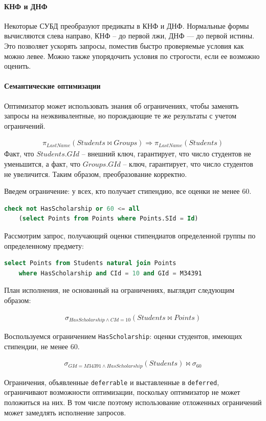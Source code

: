 \paragraph{КНФ и ДНФ}

Некоторые СУБД преобразуют предикаты в КНФ и ДНФ. Нормальные формы вычисляются слева направо, КНФ
-- до первой лжи, ДНФ --- до первой истины. Это позволяет ускорять запросы, поместив быстро
проверяемые условия как можно левее. Можно также упорядочить условия по строгости, если ее возможно
оценить.

\paragraph{Семантические оптимизации}

Оптимизатор может использовать знания об ограничениях, чтобы заменять запросы на неэквивалентные,
но порождающие те же результаты с учетом ограничений.

\begin{example}
	\enewline
	\begin{align}
		\pi_{LastName}(Students \bowtie Groups) \Rightarrow \pi_{LastName}(Students)
	\end{align}
	Факт, что $Students.GId$ -- внешний ключ, гарантирует, что число студентов не уменьшится, а
	факт, что $Groups.GId$ -- ключ, гарантирует, что число студентов не увеличится. Таким
	образом, преобразование корректно.
\end{example}

\begin{example}
	Введем ограничение: у всех, кто получает стипендию, все оценки не менее 60.

	\begin{lstlisting}[language=SQL]
    check not HasScholarship or 60 <= all
    (select Points from Points where Points.SId = Id)
    \end{lstlisting}

	Рассмотрим запрос, получающий оценки стипендиатов определенной группы по определенному предмету:

	\begin{lstlisting}[language=SQL]
    select Points from Students natural join Points
    where HasScholarship and CId = 10 and GId = M34391
    \end{lstlisting}

	План исполнения, не основанный на ограничениях, выглядит следующим образом:

	\begin{align}
		\sigma_{HasScholarship \wedge CId = 10}(Students \bowtie Points)
	\end{align}

	Воспользуемся ограничением \texttt{HasScholarship}: оценки студентов, имеющих стипендии, не менее
	60.

	\begin{align}
		\sigma_{GId = M34391 \wedge HasScholarship}(Students) \bowtie \sigma_{60 }
	\end{align}
\end{example}

\begin{remark}
	Ограничения, объявленные \texttt{deferrable} и выставленные в \texttt{deferred},
	ограничивают возможности оптимизации, поскольку оптимизатор не может положиться на них. В том числе
	поэтому использование отложенных ограничений может замедлять исполнение запросов.
\end{remark}